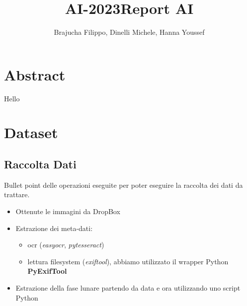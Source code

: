 \title{AI-2023}\documentclass[12pt,a4paper,twoside]{article}
\author{Brajucha Filippo, Dinelli Michele, Hanna Youssef}
\title{Report AI}
\begin{document}
\maketitle

\section*{Abstract}
Hello

\newpage

\tableofcontents

\newpage

\section{Dataset}

\subsection{Raccolta Dati}
Bullet point delle operazioni eseguite per poter eseguire la raccolta dei dati da trattare.
\begin{itemize}
    \item Ottenute le immagini da DropBox
    \item Estrazione dei meta-dati:
    \begin{itemize}
        \item ocr (\textit{easyocr}, \textit{pytesseract})
        \item lettura filesystem (\textit{exiftool}), abbiamo utilizzato il wrapper Python \textbf{PyExifTool}
    \end{itemize}
    \item Estrazione della fase lunare partendo da data e ora utilizzando uno script Python
\end{itemize}
\end{document}
